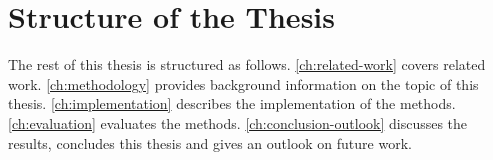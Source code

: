 
\section{Structure of the Thesis}\label{sec:structure-of-the-thesis}
The rest of this thesis is structured as follows.
\autoref{ch:related-work} covers related work.
\autoref{ch:methodology} provides background information on the topic of this thesis.
\autoref{ch:implementation} describes the implementation of the methods.
\autoref{ch:evaluation} evaluates the methods.
\autoref{ch:conclusion-outlook} discusses the results, concludes this thesis and gives an outlook on future work.